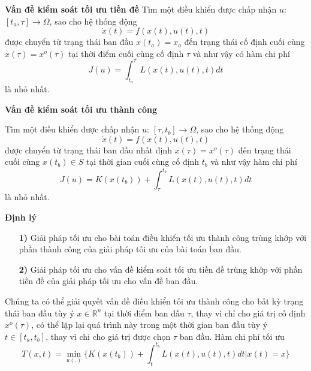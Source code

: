 \documentclass[11pt]{beamer}
\begin{document}
\begin{frame}
	\begin{block}{\textbf{Vấn đề kiểm soát tối ưu tiền đề}}
		Tìm một điều khiển được chấp nhận $u$: $[t_a, \tau] \to \Omega$, sao cho hệ thống động $$\dot{x}(t) = f(x(t),u(t),t)$$ được chuyển từ trạng thái ban đầu $x(t_a) = x_a$ đến trạng thái cố định cuối cùng $x(\tau) = x^o(\tau)$ tại thời điểm cuối cùng cố định $\tau$ và như vậy có hàm chi phí $$J(u) = \int_{t_a}^{\tau}L(x(t),u(t),t)dt$$ là nhỏ nhất.
	\end{block}
\end{frame}

\begin{frame}
	\begin{block}{\textbf{Vấn đề kiểm soát tối ưu thành công}}
		
		Tìm một điều khiển được chấp nhận $u$: $[\tau, t_b] \to \Omega$, sao cho hệ thống động $$\dot{x}(t) = f(x(t),u(t),t)$$ 
		được chuyển từ trạng thái ban đầu nhất định $x(\tau) = x^o(\tau)$ đến trạng thái cuối cùng $x(t_b) \in S$ tại thời gian cuối cùng cố định $t_b$ và như vậy hàm chi phí $$J(u) = K(x(t_b)) + \int_{\tau}^{t_b}L(x(t),u(t),t)dt$$ là nhỏ nhất.
	\end{block}

\end{frame}

\begin{frame}
	\begin{block}{\textbf{Định lý}}
		\begin{itemize}
			\item[\textbf{1)}] Giải pháp tối ưu cho bài toán điều khiển tối ưu thành công trùng khớp với phần thành công của giải pháp tối ưu của bài toán ban đầu.
			\item[\textbf{2)}] Giải pháp tối ưu cho vấn đề kiểm soát tối ưu tiền đề trùng khớp với phần tiền đề của giải pháp tối ưu cho vấn đề ban đầu. 
		\end{itemize}
	\end{block}
Chúng ta có thể giải quyết vấn đề điều khiển tối ưu thành công cho bất kỳ trạng thái ban đầu tùy ý $x\in \mathbb{R}^n$ tại thời điểm ban đầu $\tau$, thay vì chỉ cho giá trị cố định $x^o(\tau)$, có thể lặp lại quá trình này trong một thời gian ban đầu tùy ý $t \in [t_a, t_b]$, thay vì chỉ cho giá trị được chọn $\tau$ ban đầu. Hàm chi phí tối ưu $$T(x,t) = \min_{u(.)} \bigg\{K(x(t_b)) + \int_{t}^{t_b}L(x(t),u(t),t)dt \big | x(t) = x \bigg\}$$
\end{frame}
\end{document}
